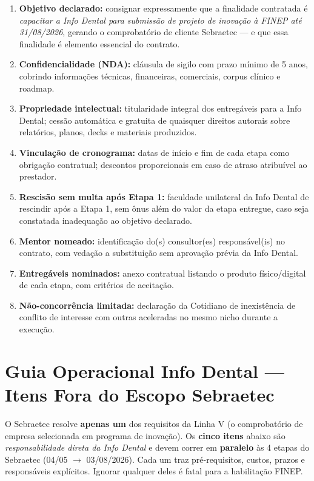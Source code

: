 \documentclass[11pt, a4paper]{article}
\begin{document}
\begin{enumerate}[label=\textcolor{primaryColor}{\textbf{C\arabic*.}}, leftmargin=2.2em]
    \item \textbf{Objetivo declarado:} consignar expressamente que a finalidade contratada é \emph{capacitar a Info Dental para submissão de projeto de inovação à FINEP até 31/08/2026}, gerando o comprobatório de cliente Sebraetec --- e que essa finalidade é elemento essencial do contrato.
    \item \textbf{Confidencialidade (NDA):} cláusula de sigilo com prazo mínimo de 5 anos, cobrindo informações técnicas, financeiras, comerciais, corpus clínico e roadmap.
    \item \textbf{Propriedade intelectual:} titularidade integral dos entregáveis para a Info Dental; cessão automática e gratuita de quaisquer direitos autorais sobre relatórios, planos, decks e materiais produzidos.
    \item \textbf{Vinculação de cronograma:} datas de início e fim de cada etapa como obrigação contratual; descontos proporcionais em caso de atraso atribuível ao prestador.
    \item \textbf{Rescisão sem multa após Etapa 1:} faculdade unilateral da Info Dental de rescindir após a Etapa 1, sem ônus além do valor da etapa entregue, caso seja constatada inadequação ao objetivo declarado.
    \item \textbf{Mentor nomeado:} identificação do(s) consultor(es) responsável(is) no contrato, com vedação a substituição sem aprovação prévia da Info Dental.
    \item \textbf{Entregáveis nominados:} anexo contratual listando o produto físico/digital de cada etapa, com critérios de aceitação.
    \item \textbf{Não-concorrência limitada:} declaração da Cotidiano de inexistência de conflito de interesse com outras aceleradas no mesmo nicho durante a execução.
\end{enumerate}

\section{Guia Operacional Info Dental --- Itens Fora do Escopo Sebraetec}

O Sebraetec resolve \textbf{apenas um} dos requisitos da Linha V (o comprobatório de empresa selecionada em programa de inovação). Os \textbf{cinco itens} abaixo são \emph{responsabilidade direta da Info Dental} e devem correr em \textbf{paralelo} às 4 etapas do Sebraetec (04/05 $\to$ 03/08/2026). Cada um traz pré-requisitos, custos, prazos e responsáveis explícitos. Ignorar qualquer deles é fatal para a habilitação FINEP.
\end{document}
